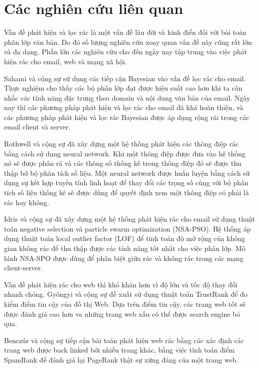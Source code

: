 \section{Các nghiên cứu liên quan}
Vấn đề phát hiện và lọc rác là một vấn đề lâu đời và kinh điển đối với bài toán phân lớp văn bản. Do đó số lượng nghiên cứu xoay quan vấn đề này cũng rất lớn và đa dạng. Phần lớn các nghiên cứu cho đến ngày nay tập trung vào việc phát hiện rác cho email, web và mạng xã hội. 

Sahami và cộng sự \cite{Sahami1998ABA} sử dụng các tiếp cận Bayesian vào vấn đề lọc rác cho email. Thực nghiệm cho thấy các bộ phân lớp đạt được hiệu suất cao hơn khi ta cân nhắc các tính năng đặc trưng theo domain và nội dung văn bản của email. Ngày nay thì các phương pháp phát hiện và lọc rác cho email đã khá hoàn thiện, và các phương pháp phát hiện và lọc rác Bayesian được áp dụng rộng rãi trong các email client và server.

Rothwell và cộng sự\cite{rothwell2004intelligent} đã xây dựng một hệ thống phát hiện các thông điệp rác bằng cách sử dụng neural network. Khi một thông điệp được đưa vào hệ thống nó sẽ được phân rã và các thông số thống kê trong thông điệp đó sẽ được thu thập bở bộ phân tích số liệu. Một neural network được huấn luyện bằng cách sử dụng sự kết hợp tuyến tính linh hoạt để thay đổi các trọng số cùng với bộ phân tích số liệu thống kê sẽ được dùng để quyết định xem một thông điệp có phải là rác hay không.  

Idris và cộng sự\cite{IDRIS201533} đã xây dựng một hệ thống phát hiện rác cho email sử dụng thuật toán negative selection và particle swarm optimization (NSA-PSO). Hệ thống áp dụng thuật toán local outlier factor (LOF) để tính toán độ mở rộng của không gian không rác để thu thập được các tính năng tốt nhất cho việc phân lớp. Mô hình NSA-SPO được dùng để phân biệt giữa rác và không rác trong các mạng client-server.

Vấn đề phát hiện rác cho web thì khó khăn hơn vì độ lớn và tốc độ thay đổi nhanh chóng. Gy\"{o}ngyi và cộng sự \cite{Gyongyi:2004:CWS:1316689.1316740} đề xuất sử dụng thuật toán TrustRank để đo kiểm điểm tin cậy của đồ thị Web. Dựa trên điểm tin cậy, các trang web tốt sẽ được đánh giá cao hơn va những trang web xấu có thể được search engine bỏ qua. 

Benczúr và cộng sự\cite{benczur} tiếp cận bài toán phát hiện web rác bằng các xác định các trang web được back linked bởi nhiều trang khác, bằng việc tính toán điểm SpamRank để đánh giá lại PageRank thật sự xứng đáng của một trang web. 

